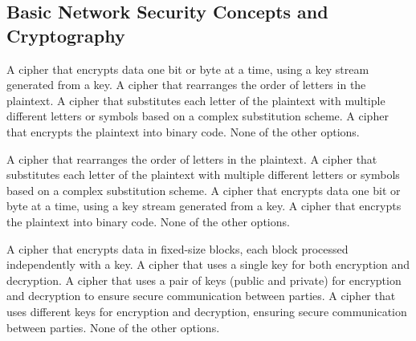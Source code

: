 \subsection{Basic Network Security Concepts and Cryptography}

\begin{checkboxes}
    \CorrectChoice A cipher that encrypts data one bit or byte at a time, using a key stream generated from a key.
    \choice A cipher that rearranges the order of letters in the plaintext.
    \choice A cipher that substitutes each letter of the plaintext with multiple different letters or symbols based on a complex substitution scheme.
    \choice A cipher that encrypts the plaintext into binary code.
    \choice None of the other options.
\end{checkboxes}

\begin{checkboxes}
    \choice A cipher that rearranges the order of letters in the plaintext.
    \choice A cipher that substitutes each letter of the plaintext with multiple different letters or symbols based on a complex substitution scheme.
    \choice A cipher that encrypts data one bit or byte at a time, using a key stream generated from a key.
    \choice A cipher that encrypts the plaintext into binary code.
    \CorrectChoice None of the other options.
\end{checkboxes}




\begin{checkboxes}
    \choice A cipher that encrypts data in fixed-size blocks, each block processed independently with a key.
    \choice A cipher that uses a single key for both encryption and decryption.
    \CorrectChoice A cipher that uses a pair of keys (public and private) for encryption and decryption to ensure secure communication between parties.
    \CorrectChoice A cipher that uses different keys for encryption and decryption, ensuring secure communication between parties.
    \choice None of the other options.
\end{checkboxes}



